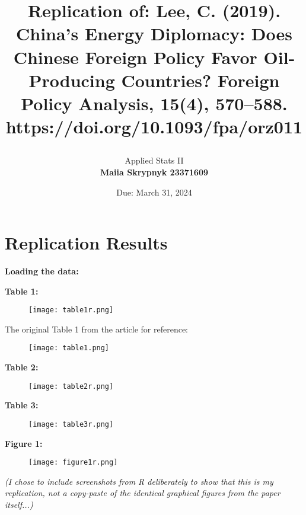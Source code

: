 \documentclass[12pt,letterpaper]{article}
\title{\textbf{Replication of:} Lee, C. (2019). China’s Energy Diplomacy: Does Chinese Foreign Policy Favor Oil-Producing Countries? Foreign Policy Analysis, 15(4), 570–588. https://doi.org/10.1093/fpa/orz011

}
\date{Due: March 31, 2024}
\author{Applied Stats II \\ \vspace{\baselineskip}
	\textbf{Maiia Skrypnyk 23371609}}
\begin{document}
	\maketitle

\section{Replication Results }

\textbf{Loading the data:}
 


\textbf{Table 1:}

 


\begin{figure}[H]
    \centering
    \texttt{[image: table1r.png]}
\end{figure}

The original Table 1 from the article for reference:

\begin{figure}[H]
    \centering
    \texttt{[image: table1.png]}
\end{figure}

\textbf{Table 2:}

 

\begin{figure}[H]
    \centering
    \texttt{[image: table2r.png]}
\end{figure}

\newpage 
\textbf{Table 3:}

 

\begin{figure}[H]
    \centering
    \texttt{[image: table3r.png]}
\end{figure}

\textbf{Figure 1:}
 

\begin{figure}[H]
    \centering
    \texttt{[image: figure1r.png]}
\end{figure}

\textit{(I chose to include screenshots from R deliberately to show that this is my replication, not a copy-paste of the identical graphical figures from the paper itself...)}
\end{document}
